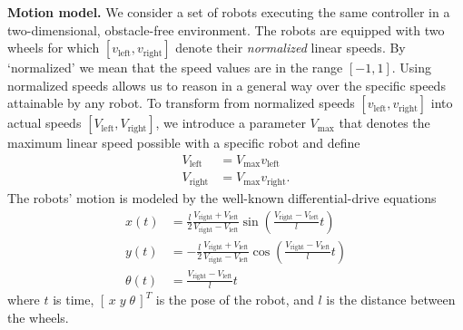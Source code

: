 \documentclass[conference]{IEEEtran}
\newcommand{\myparagraph}[1]{\textbf{#1.}}
\begin{document}
\newcommand{\vL}{\ensuremath{v_{\text{left}}}}
\newcommand{\vR}{\ensuremath{v_{\text{right}}}}
\newcommand{\vaL}{\ensuremath{V_{\text{left}}}}
\newcommand{\vaR}{\ensuremath{V_{\text{right}}}}
\newcommand{\VM}{\ensuremath{V_{\text{max}}}}
\myparagraph{Motion model}
We consider a set of robots executing the same controller in a two-dimensional,
obstacle-free environment. The robots are equipped with two wheels for which
$[\vL,\vR]$ denote their \emph{normalized} linear speeds. By `normalized' we
mean that the speed values are in the range $[-1, 1]$. Using normalized speeds
allows us to reason in a general way over the specific speeds attainable by any
robot. To transform from normalized speeds $[\vL,\vR]$ into actual speeds
$[\vaL,\vaR]$, we introduce a parameter $\VM$ that denotes the maximum linear
speed possible with a specific robot and define
\begin{align}
  \vaL &= \VM \vL\\
  \vaR &= \VM \vR.
\end{align}
The robots' motion is modeled by the well-known differential-drive
equations~\cite{Dudek2010}
\begin{equation}
  \label{eq:diffdrive}
  \begin{aligned}
    x(t)      &=  \frac{l}{2}\frac{\vaR+\vaL}{\vaR-\vaL}\sin\left(\frac{\vaR-\vaL}{l}t\right)\\
    y(t)      &= -\frac{l}{2}\frac{\vaR+\vaL}{\vaR-\vaL}\cos\left(\frac{\vaR-\vaL}{l}t\right)\\
    \theta(t) &=  \frac{\vaR-\vaL}{l}t
  \end{aligned}
\end{equation}
where $t$ is time, $[\,x\;y\;\theta\,]^T$ is the pose of the robot, and $l$ is
the distance between the wheels.
\end{document}
